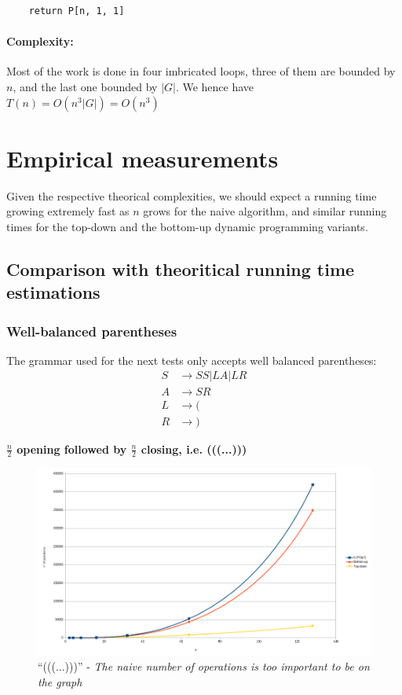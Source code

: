 \documentclass[]{article}
\begin{document}
\begin{multicols}{2}
\begin{lstlisting}
    return P[n, 1, 1]
\end{lstlisting}

\paragraph{Complexity:}
Most of the work is done in four imbricated loops, three of them are bounded by $n$, and the last one
bounded by $|G|$.
We hence have $T(n)=O(n^3|G|)=O(n^3)$

\newpage
\section{Empirical measurements}
Given the respective theorical complexities, we should expect a running time growing extremely fast as $n$ grows for the naive algorithm, and similar running times for the top-down and the bottom-up dynamic programming variants.
\subsection{Comparison with theoritical running time estimations}
\subsubsection{Well-balanced parentheses}
The grammar used for the next tests only accepts well balanced parentheses:
\begin{align*}
  S&\rightarrow SS | LA | LR\\
  A&\rightarrow SR\\
  L&\rightarrow (\\
  R&\rightarrow )
\end{align*}

\end{multicols}
\textbf{$\frac n2$ opening followed by $\frac n2$ closing, i.e. (((...)))}\\ 
\begin{figure}[h]
  \label{fig:plr}
  \includegraphics[width=\textwidth]{paren/complexity_paren_lefts_rights}
  \caption{``(((...)))'' - \textit{The naive number of operations is too important to be on
      the graph}}
\end{figure}
\end{document}
